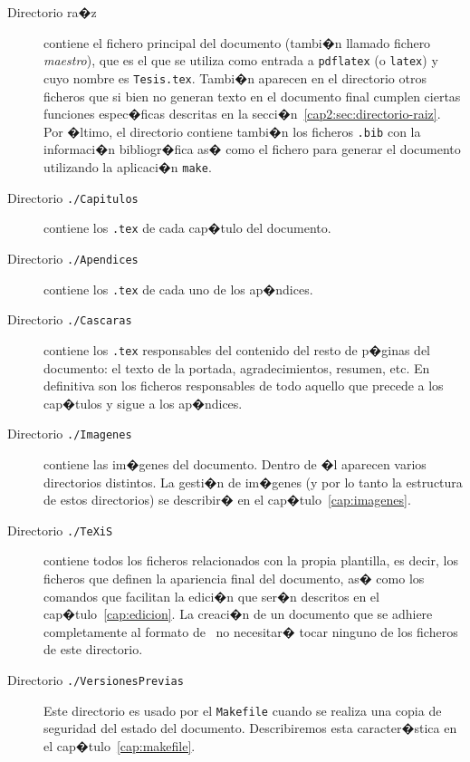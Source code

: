 \begin{description}
\item[Directorio ra�z] contiene el fichero principal del documento
  (tambi�n llamado fichero \emph{maestro}), que es el que se utiliza
  como entrada a \texttt{pdflatex} (o \texttt{latex}) y cuyo nombre es
  \texttt{Tesis.tex}. Tambi�n aparecen en el directorio otros ficheros
  que si bien no generan texto en el documento final cumplen ciertas
  funciones espec�ficas descritas en la
  secci�n~\ref{cap2:sec:directorio-raiz}. Por �ltimo, el directorio
  contiene tambi�n los ficheros \texttt{.bib} con la informaci�n
  bibliogr�fica as� como el fichero para generar el documento
  utilizando la aplicaci�n \verb+make+.

\item[Directorio \texttt{./Capitulos}] contiene los \texttt{.tex} de
  cada cap�tulo del documento.

\item[Directorio \texttt{./Apendices}] contiene los \texttt{.tex} de
  cada uno de los ap�ndices.

\item[Directorio \texttt{./Cascaras}] contiene los \texttt{.tex}
  responsables del contenido del resto de p�ginas del documento: el
  texto de la portada, agradecimientos, resumen, etc. En definitiva
  son los ficheros responsables de todo aquello que precede a los
  cap�tulos y sigue a los ap�ndices.

\item[Directorio \texttt{./Imagenes}] contiene las im�genes del
  documento. Dentro de �l aparecen varios directorios distintos. La
  gesti�n de im�genes (y por lo tanto la estructura de estos
  directorios) se describir� en el cap�tulo~\ref{cap:imagenes}.

\item[Directorio \texttt{./TeXiS}] contiene todos los ficheros
  relacionados con la propia plantilla, es decir, los ficheros que
  definen la apariencia final del documento, as� como los comandos que
  facilitan la edici�n que ser�n descritos en el
  cap�tulo~\ref{cap:edicion}. La creaci�n de un documento que se
  adhiere completamente al formato de \texis\ no necesitar� tocar
  ninguno de los ficheros de este directorio.

\item[Directorio \texttt{./VersionesPrevias}] Este directorio es
  usado por el \texttt{Makefile} cuando se realiza una copia de
  seguridad del estado del documento. Describiremos esta
  caracter�stica en el cap�tulo~\ref{cap:makefile}.
\end{description}

